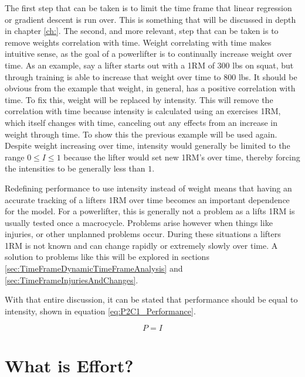 The first step that can be taken is to limit the time frame that linear regression or gradient descent is run over. This is something that will be discussed in depth in chapter \ref{ch:}. The second, and more relevant, step that can be taken is to remove weights correlation with time. Weight correlating with time makes intuitive sense, as the goal of a powerlifter is to continually increase weight over time. As an example, say a lifter starts out with a 1RM of $300$ lbs on squat, but through training is able to increase that weight over time to $800$ lbs. It should be obvious from the example that weight, in general, has a positive correlation with time. To fix this, weight will be replaced by intensity. This will remove the correlation with time because intensity is calculated using an exercises 1RM, which itself changes with time, canceling out any effects from an increase in weight through time. To show this the previous example will be used again. Despite weight increasing over time, intensity would generally be limited to the range $0\le I\le 1$ because the lifter would set new 1RM's over time, thereby forcing the intensities to be generally less than $1$.

Redefining performance to use intensity instead of weight means that having an accurate tracking of a lifters 1RM over time becomes an important dependence for the model. For a powerlifter, this is generally not a problem as a lifts 1RM is usually tested once a macrocycle. Problems arise however when things like injuries, or other unplanned problems occur. During these situations a lifters 1RM is not known and can change rapidly or extremely slowly over time. A solution to problems like this will be explored in sections \ref{sec:TimeFrameDynamicTimeFrameAnalysis} and \ref{sec:TimeFrameInjuriesAndChanges}.

With that entire discussion, it can be stated that performance should be equal to intensity, shown in equation \ref{eq:P2C1_Performance}.

\begin{equation}
	\label{eq:P2C1_Performance}
	P=I
\end{equation}

\section{What is Effort?}
\label{sec:P2C1_WhatIsEffort}

